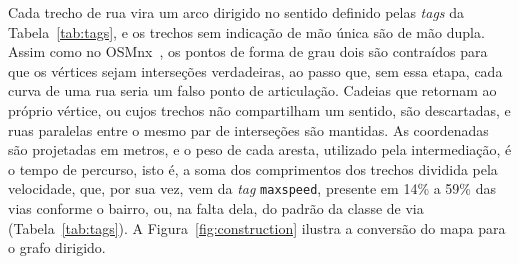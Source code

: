 Cada trecho de rua vira um arco dirigido no sentido definido pelas \emph{tags}
da Tabela~\ref{tab:tags}, e os trechos sem indicação de mão única são de mão
dupla.
Assim como no OSMnx~\cite{boeing}, os pontos de forma de grau dois são contraídos para que os vértices sejam interseções verdadeiras, ao passo que, sem essa etapa, cada
curva de uma rua seria um falso ponto de articulação. Cadeias que retornam ao
próprio vértice, ou cujos trechos não compartilham um sentido, são
descartadas, e ruas paralelas entre o mesmo par de interseções são mantidas.
As coordenadas são projetadas em metros, e o peso de cada aresta, utilizado
pela intermediação, é o tempo de percurso, isto é, a soma dos comprimentos dos trechos dividida pela
velocidade, que, por sua vez, vem da \emph{tag} \texttt{maxspeed}, presente em 14\% a 59\%
das vias conforme o bairro, ou, na falta dela, do padrão da classe de via
(Tabela~\ref{tab:tags}). A Figura~\ref{fig:construction} ilustra a conversão
do mapa para o grafo dirigido.

